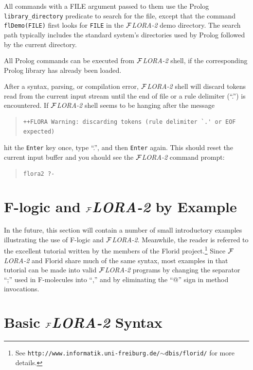 \documentclass[11pt]{article}
\newcommand{\FLORA}{{\mbox{${\cal F}${\small\it LORA}\rm\emph{-2}}}\xspace}
\newcommand{\FLORID}{{\mbox{\sc Florid}}\xspace}
\newcommand{\fl}{\mbox{F-logic}\xspace}
\begin{document}
All commands with a FILE argument passed to them use the Prolog
{\tt library\_directory} predicate to search for the file, except that the
command {\tt flDemo(FILE)} first looks for {\tt FILE} in the \FLORA demo
directory. The search path typically includes the standard system's
directories used by Prolog followed by the current directory. 

All Prolog commands can be executed from \FLORA shell, if the corresponding
Prolog library has already been loaded.

After a syntax, parsing, or compilation error, \FLORA shell will
discard tokens read from the current input stream until the end of file or a
rule delimiter (``.'') is encountered. If \FLORA shell seems to be hanging
after the message
\begin{quote}
\begin{verbatim}
++FLORA Warning: discarding tokens (rule delimiter `.' or EOF expected)
\end{verbatim}
\end{quote}
hit the {\tt Enter} key once, type ``.'', and then {\tt Enter} again.  This
should reset the current input buffer and you should see the \FLORA command
prompt:
\begin{quote}
\begin{verbatim}
flora2 ?-
\end{verbatim}
\end{quote}

 
\section{\fl and \FLORA by Example}


In the future, this section will contain a number of small
introductory examples illustrating the use of \fl and \FLORA. Meanwhile, the
reader is referred to the excellent tutorial written by the members of the
\FLORID project.\footnote{
  See {\tt http://www.informatik.uni-freiburg.de/$\sim$dbis/florid/} for more
  details.
  }
Since \FLORA and \FLORID share much of the same syntax, most examples in that
tutorial can be made into valid \FLORA programs by changing the separator
``;'' used in F-molecules into ``,'' and by eliminating the ``@''
sign in method invocations.



\section{Basic \FLORA Syntax}
\end{document}
